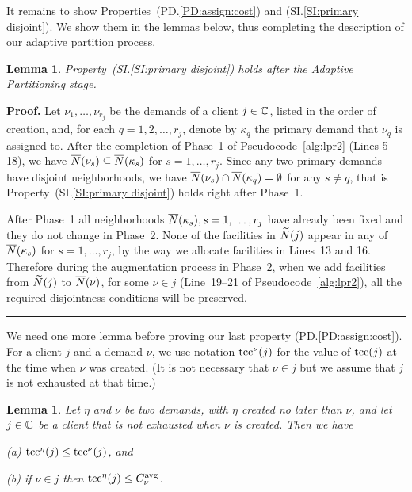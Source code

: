 \documentclass[oneside,final]{ucr}
\newtheorem{lemma}[theorem]{Lemma}
\newenvironment{proof}[1][Proof]{\textbf{#1.} }{\ \rule{0.5em}{0.5em}}
\begin{document}
It remains to show Properties~(PD.\ref{PD:assign:cost}) and
(SI.\ref{SI:primary disjoint}). We show them in the lemmas
below, thus completing the description of our adaptive
partition process.


\begin{lemma}\label{lem: property SI:primary disjoint holds}
  Property~(SI.\ref{SI:primary disjoint}) holds after the
  Adaptive Partitioning stage.
\end{lemma}

\begin{proof}
  Let $\nu_1,\ldots,\nu_{r_j}$ be the demands of a client
  $j\in\mathbb{C}$, listed in the order of creation, and, for each
  $q=1,2,\ldots,r_j$, denote by $\kappa_q$ the primary demand that
  $\nu_q$ is assigned to. After the completion of Phase~1 of
  Pseudocode~\ref{alg:lpr2} (Lines 5--18), we have
  ${\overline{N}}(\nu_s)\subseteq {\overline{N}}(\kappa_s)$ for  $s=1,\ldots,r_j$. 
Since any two primary demands have disjoint
  neighborhoods, we have ${\overline{N}}(\nu_s) \cap {\overline{N}}(\kappa_q) =
  \emptyset$ for any $s\neq q$, that is
	Property~(SI.\ref{SI:primary disjoint}) holds right after Phase~1.

        After Phase~1 all neighborhoods ${\overline{N}}(\kappa_s),
        s=1,\ldots,r_j$ have already been fixed and they do not change
        in Phase~2.  None of the facilities in ${\widetilde N}(j)$ appear in
        any of ${\overline{N}}(\kappa_s)$ for $s=1,\ldots,r_j$, by the way we
        allocate facilities in Lines~13 and 16.  Therefore during the
        augmentation process in Phase~2, when we add facilities from
        ${\widetilde N}(j)$ to ${\overline{N}}(\nu)$, for some $\nu\in j$
        (Line~19--21 of Pseudocode~\ref{alg:lpr2}), all the required
        disjointness conditions will be preserved.
\end{proof}


We need one more lemma before proving our last property
(PD.\ref{PD:assign:cost}).  For a client $j$ and a demand
$\nu$, we use notation $\mbox{\rm{tcc}}^{\nu}(j)$ for the value of
$\mbox{\rm{tcc}}(j)$ at the time when $\nu$ was created. (It is not
necessary that $\nu\in j$ but we assume that $j$ is not
exhausted at that time.)


\begin{lemma}\label{lem: tcc optimal}
  Let $\eta$ and $\nu$ be two demands, with $\eta$ created
  no later than $\nu$, and let $j\in\mathbb{C}$ be a client
  that is not exhausted when $\nu$ is created. Then we have
\begin{description}
	\item{(a)} $\mbox{\mbox{\rm{tcc}}}^\eta(j) \le \mbox{\mbox{\rm{tcc}}}^{\nu}(j)$, and 
	\item{(b)} if $\nu\in j$ then $\mbox{\mbox{\rm{tcc}}}^\eta(j) \le C^{{\mbox{\scriptsize\rm avg}}}_{\nu}$.
\end{description}
\end{lemma}
\end{document}
